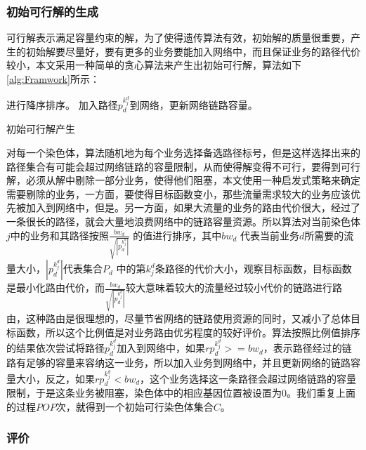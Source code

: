 \subsubsection{初始可行解的生成}
可行解表示满足容量约束的解，为了使得遗传算法有效，初始解的质量很重要，产生的初始解要尽量好，要有更多的业务要能加入网络中，而且保证业务的路径代价较小，本文采用一种简单的贪心算法来产生出初始可行解，算法如下\ref{alg:Framwork}所示：
\begin{algorithm}[htb]
\begin{algorithmic}[1]
\EndFor
{}进行降序排序。
\State 加入路径$p^{k^d_j}_d$到网络，更新网络链路容量。
\Else
{}
\EndIf
\EndFor
\EndFor
\end{algorithmic}
\caption{初始可行解产生}
\label{alg:Framwork}
\end{algorithm}

对每一个染色体，算法随机地为每个业务选择备选路径标号，但是这样选择出来的路径集合有可能会超过网络链路的容量限制，从而使得解变得不可行，要得到可行解，必须从解中剔除一部分业务，使得他们阻塞，本文使用一种启发式策略来确定需要剔除的业务，一方面，要使得目标函数变小，那些流量需求较大的业务应该优先被加入到网络中，但是。另一方面，如果大流量的业务的路由代价很大，经过了一条很长的路径，就会大量地浪费网络中的链路容量资源。所以算法对当前染色体$j$中的业务和其路径按照$\frac{bw_d}{\sqrt{|p^{k^d_j}_d|}}$ 的值进行排序，其中${bw_d}$ 代表当前业务$d$所需要的流量大小，$|p^{k^d_j}_d|$代表集合$P_d$ 中的第${k^d_j}$条路径的代价大小，观察目标函数，目标函数是最小化路由代价，而$\frac{bw_d}{\sqrt{|p^{k^d_j}_d|}}$较大意味着较大的流量经过较小代价的链路进行路由，这种路由是很理想的，尽量节省网络的链路使用资源的同时，又减小了总体目标函数，所以这个比例值是对业务路由优劣程度的较好评价。算法按照比例值排序的结果依次尝试将路径$p^{k^d_j}_d$加入到网络中，如果$rp^{k^d_j}_d>=bw_d$，表示路径经过的链路有足够的容量来容纳这一业务，所以加入业务到网络中，并且更新网络的链路容量大小，反之，如果$rp^{k^d_j}_d<bw_d$，这个业务选择这一条路径会超过网络链路的容量限制，于是这条业务被阻塞，染色体中的相应基因位置被设置为0。我们重复上面的过程$POP$次，就得到一个初始可行染色体集合$C$。
\subsubsection{评价}

